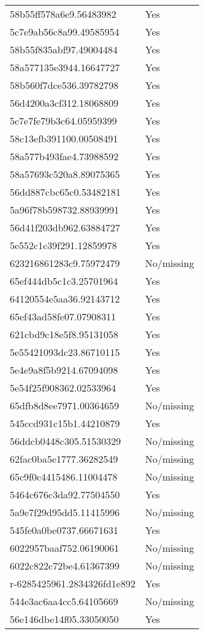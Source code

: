 \begin{tabular}{ll}
58b55ff578a6e9.56483982 & Yes \\
5c7e9ab56c8a99.49585954 & Yes \\
58b55f835abf97.49004484 & Yes \\
58a577135e3944.16647727 & Yes \\
58b560f7dce536.39782798 & Yes \\
56d4200a3cf312.18068809 & Yes \\
5c7e7fe79b3c64.05959399 & Yes \\
58c13efb391100.00508491 & Yes \\
58a577b493fae4.73988592 & Yes \\
58a57693c520a8.89075365 & Yes \\
56dd887cbc65c0.53482181 & Yes \\
5a96f78b598732.88939991 & Yes \\
56d41f203db962.63884727 & Yes \\
5e552c1c39f291.12859978 & Yes \\
623216861283c9.75972479 & No/missing \\
65ef444db5c1c3.25701964 & Yes \\
64120554e5aa36.92143712 & Yes \\
65ef43ad58fe07.07908311 & Yes \\
621cbd9c18e5f8.95131058 & Yes \\
5e55421093dc23.86710115 & Yes \\
5e4e9a8f5b9214.67094098 & Yes \\
5e54f25f908362.02533964 & Yes \\
65dfb8d8ee7971.00364659 & No/missing \\
545ccd931c15b1.44210879 & Yes \\
56ddcb0448c305.51530329 & No/missing \\
62fac0ba5e1777.36282549 & No/missing \\
65c9f0c4415486.11004478 & No/missing \\
5464c676c3da92.77504550 & Yes \\
5a9e7f29d95dd5.11415996 & No/missing \\
545fe0a0be0737.66671631 & Yes \\
6022957baaf752.06190061 & No/missing \\
6022c822c72be4.61367399 & No/missing \\
r-6285425961.2834326fd1e892 & Yes \\
544e3ac6aa4cc5.64105669 & No/missing \\
56e146dbe14f05.33050050 & Yes \\

\end{tabular}
